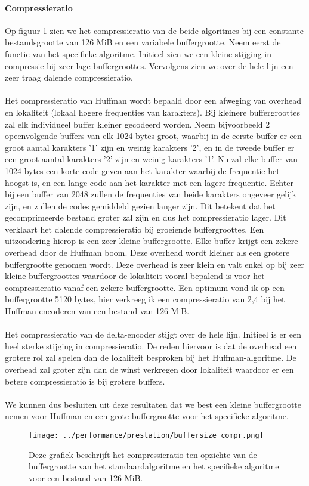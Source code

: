 \documentclass[11pt, a4paper]{article}
\begin{document}
\paragraph{Compressieratio}
Op figuur \ref{fig:buffersize_compr} zien we het compressieratio van de beide algoritmes bij een constante bestandsgrootte van 126 MiB en een variabele buffergrootte. Neem eerst de functie van het specifieke algoritme. Initieel zien we een kleine stijging in compressie bij zeer lage buffergroottes. Vervolgens zien we over de hele lijn een zeer traag dalende compressieratio. 
\\\\Het compressieratio van Huffman wordt bepaald door een afweging van overhead en lokaliteit (lokaal hogere frequenties van karakters). Bij kleinere buffergroottes zal elk individueel buffer kleiner gecodeerd worden. Neem bijvoorbeeld 2 opeenvolgende buffers van elk 1024 bytes groot, waarbij in de eerste buffer er een groot aantal karakters '1' zijn en weinig karakters '2', en in de tweede buffer er een groot aantal karakters '2' zijn en weinig karakters '1'. Nu zal elke buffer van 1024 bytes een korte code geven aan het karakter waarbij de frequentie het hoogst is, en een lange code aan het karakter met een lagere frequentie. Echter bij een buffer van 2048 zullen de frequenties van beide karakters ongeveer gelijk zijn, en zullen de codes gemiddeld gezien langer zijn. Dit betekent dat het gecomprimeerde bestand groter zal zijn en dus het compressieratio lager. Dit verklaart het dalende compressieratio bij groeiende buffergroottes. Een uitzondering hierop is een zeer kleine buffergrootte. Elke buffer krijgt een zekere overhead door de Huffman boom. Deze overhead wordt kleiner als een grotere buffergrootte genomen wordt. Deze overhead is zeer klein en valt enkel op bij zeer kleine buffergroottes waardoor de lokaliteit vooral bepalend is voor het compressieratio vanaf een zekere buffergrootte. Een optimum vond ik op een buffergrootte 5120 bytes, hier verkreeg ik een compressieratio van 2,4 bij het Huffman encoderen van een bestand van 126 MiB.	 
\\\\Het compressieratio van de delta-encoder stijgt over de hele lijn. Initieel is er een heel sterke stijging in compressieratio. De reden hiervoor is dat de overhead een grotere rol zal spelen dan de lokaliteit besproken bij het Huffman-algoritme. De overhead zal groter zijn dan de winst verkregen door lokaliteit waardoor er een betere compressieratio is bij grotere buffers.
\\\\We kunnen dus besluiten uit deze resultaten dat we best een kleine buffergrootte nemen voor Huffman en een grote buffergrootte voor het specifieke algoritme. 
\begin{figure}
	\begin{center}
		\texttt{[image: ../performance/prestation/buffersize\_compr.png]}
	\end{center}
	\caption{Deze grafiek beschrijft het compressieratio ten opzichte van de buffergrootte van het standaardalgoritme en het specifieke algoritme voor een bestand van 126 MiB.}
	\label{fig:buffersize_compr}
\end{figure}
\end{document}
